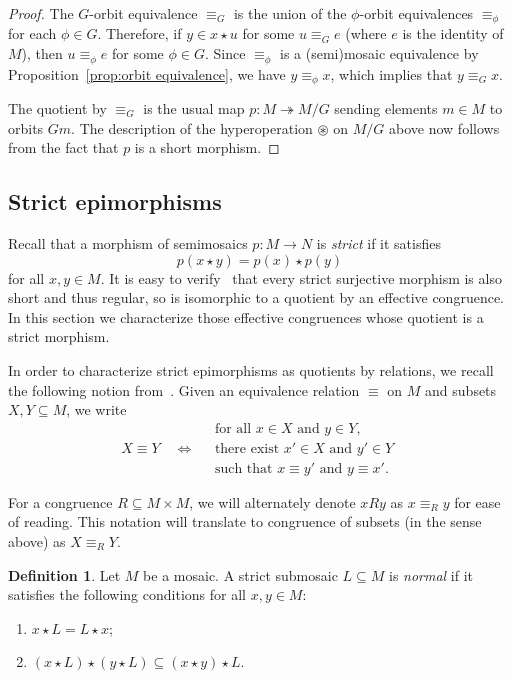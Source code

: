 \documentclass[reqno]{amsart}
\newcommand{\ostar}{\circledast}
\numberwithin{equation}{section}
\theoremstyle{plain}
\theoremstyle{definition}
\newtheorem{definition}[equation]{Definition}
\begin{document}
\begin{proof}
The $G$-orbit equivalence $\equiv_G$ is the union of the $\phi$-orbit equivalences $\equiv_\phi$ for each $\phi \in G$. Therefore, if $y\in x \star u$ for some $u\equiv_G e$ (where $e$ is the identity of $M$), then $u \equiv_{\phi} e$ for some $\phi \in G$. Since $\equiv_\phi$ is a (semi)mosaic equivalence by Proposition~\ref{prop:orbit equivalence}, we have $y\equiv_\phi x$, which implies that $y\equiv_G x$.

The quotient by $\equiv_G$ is the usual map $p \colon M \twoheadrightarrow M/G$ sending elements $m \in M$ to orbits $Gm$. The description of the hyperoperation $\ostar$ on $M/G$ above now follows from the fact that $p$ is a short morphism.
\end{proof}

\subsection{Strict epimorphisms}


Recall that a morphism of semimosaics $p \colon M \to N$ is \emph{strict} if it satisfies 
\[
p(x \star y) = p(x) \star p(y)
\]
for all $x,y \in M$.
It is easy to verify~\cite[Lemma~2.13]{NakamuraReyes} that every strict surjective morphism is also short and thus regular, so is isomorphic to a quotient by an effective congruence. In this section we characterize those effective congruences whose quotient is a strict morphism.


In order to characterize strict epimorphisms as quotients by relations, we recall the following notion from~\cite[Definition~3.10]{Jun:geometry}. Given an equivalence relation $\equiv$ on $M$ and subsets $X,Y \subseteq M$, we write 
\[
X \equiv Y \quad \iff \quad 
\begin{array}{l} 
    \mbox{for all } x \in X \mbox{ and } y \in Y, \\
    \mbox{there exist } x' \in X \mbox{ and } y' \in Y \\
    \mbox{such that } x \equiv y' \mbox{ and } y \equiv x'.
\end{array}
\]


For a congruence $R \subseteq M \times M$, we will alternately denote $xRy$ as $x \equiv_R y$ for ease of reading. This notation will translate to congruence of subsets (in the sense above) as $X \equiv_R Y$.

\begin{definition}
Let $M$ be a mosaic. A strict submosaic $L \subseteq M$ is \emph{normal} if it satisfies the following conditions for all $x, y \in M$:
\begin{enumerate}[label=(\roman*)]
    \item $x \star L = L \star x$;
    \item $(x \star L) \star (y \star L) \subseteq (x \star y) \star L$.
\end{enumerate}
\end{definition}
\end{document}
